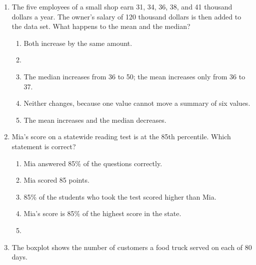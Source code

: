 \documentclass[12pt]{article}
\begin{document}
\begin{enumerate}[leftmargin=1.9em, itemsep=0.13in]
  \boxguard[11]
  \item The five employees of a small shop earn 31, 34, 36, 38, and 41 thousand dollars a
        year. The owner's salary of 120 thousand dollars is then added to the data set. What
        happens to the mean and the median?
        \begin{enumerate}[label=\textbf{(\Alph*)}, leftmargin=2.2em, itemsep=2pt]
          \item Both increase by the same amount.
          \item {}
          \item The median increases from 36 to 50; the mean increases only from 36 to 37.
          \item Neither changes, because one value cannot move a summary of six values.
          \item The mean increases and the median decreases.\hfill{}\rule[-0.2in]{0pt}{0.48in}
        \end{enumerate}

  \boxguard[10]
  \item Mia's score on a statewide reading test is at the 85th percentile. Which statement is
        correct?
        \begin{enumerate}[label=\textbf{(\Alph*)}, leftmargin=2.2em, itemsep=2pt]
          \item Mia answered 85\% of the questions correctly.
          \item Mia scored 85 points.
          \item 85\% of the students who took the test scored higher than Mia.
          \item Mia's score is 85\% of the highest score in the state.
          \item {}\hfill{}\rule[-0.2in]{0pt}{0.48in}
        \end{enumerate}

  \boxguard[16]
  \item The boxplot shows the number of customers a food truck served on each of 80 days.


\end{enumerate}
\end{document}
